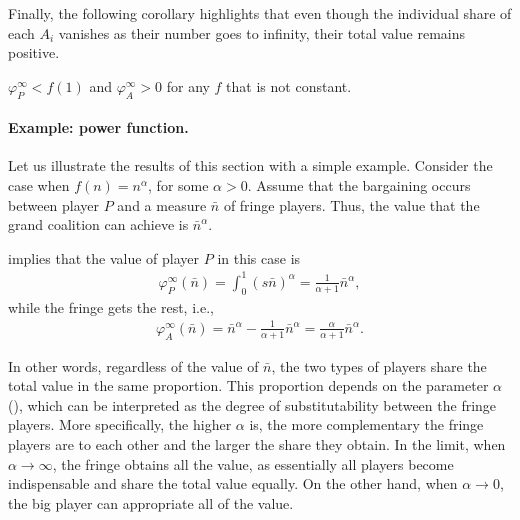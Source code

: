 Finally, the following corollary highlights that even though the individual share of each $A_i$ vanishes as their number goes to infinity, their total value remains positive.
\begin{corollary}
    \label{cor:fringe_value_2}
    $\varphi_P^\infty < f(1)$ and $\varphi_A^\infty > 0$ for any $f$ that is not constant.
\end{corollary}


\paragraph{Example: power function.}
\label{sec:power_function_example}

Let us illustrate the results of this section with a simple example.
Consider the case when $f(n) = n^\alpha$, for some $\alpha > 0$.
Assume that the bargaining occurs between player $P$ and a measure $\bar{n}$ of fringe players.
Thus, the value that the grand coalition can achieve is $\bar{n}^\alpha$.

 implies that the value of player $P$ in this case is
\begin{align*}
    \varphi_P^\infty(\bar{n}) = \int_0^1 (s \bar{n})^\alpha = \frac{1}{\alpha + 1} \bar{n}^\alpha,
\end{align*}
while the fringe gets the rest, i.e.,
\begin{align*}
    \varphi_A^\infty(\bar{n}) = \bar{n}^\alpha - \frac{1}{\alpha + 1} \bar{n}^\alpha = \frac{\alpha}{\alpha + 1} \bar{n}^\alpha.
\end{align*}

In other words, regardless of the value of $\bar{n}$, the two types of players share the total value in the same proportion.
This proportion depends on the parameter $\alpha$ (), which can be interpreted as the degree of substitutability between the fringe players.
More specifically, the higher $\alpha$ is, the more complementary the fringe players are to each other and the larger the share they obtain.
In the limit, when $\alpha \to \infty$, the fringe obtains all the value, as essentially all players become indispensable and share the total value equally.
On the other hand, when $\alpha \to 0$, the big player can appropriate all of the value.

